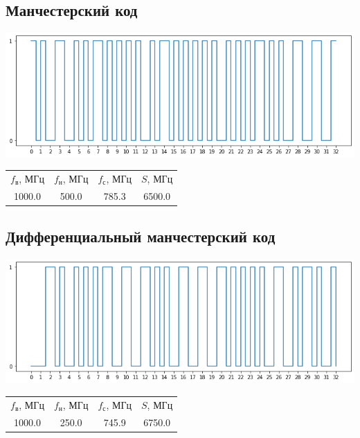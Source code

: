 \subsection{Манчестерский код}
\includegraphics[width=\textwidth]{1manchester}
\begin{center}
    \begin{tabular}{cccc}
        $f_\mathrm{\text{в}}$, МГц & $f_\mathrm{\text{н}}$, МГц & $f_\mathrm{\text{с}}$, МГц & $S$, МГц \\
        1000.0 & 500.0 & 785.3 & 6500.0 \\
    \end{tabular}
\end{center}

\subsection{Дифференциальный манчестерский код}
\includegraphics[width=\textwidth]{1manchester_diff}
\begin{center}
    \begin{tabular}{cccc}
        $f_\mathrm{\text{в}}$, МГц & $f_\mathrm{\text{н}}$, МГц & $f_\mathrm{\text{с}}$, МГц & $S$, МГц \\
        1000.0 & 250.0 & 745.9 & 6750.0 \\
    \end{tabular}
\end{center}

